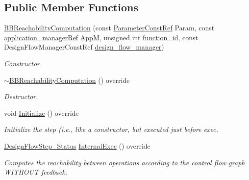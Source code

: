 \subsection*{Public Member Functions}
\begin{DoxyCompactItemize}
\item 
\hyperlink{classBBReachabilityComputation_a8bbcad478656b3c0c32e561f1e9b9536}{B\+B\+Reachability\+Computation} (const \hyperlink{Parameter_8hpp_a37841774a6fcb479b597fdf8955eb4ea}{Parameter\+Const\+Ref} Param, const \hyperlink{application__manager_8hpp_a04ccad4e5ee401e8934306672082c180}{application\+\_\+manager\+Ref} \hyperlink{classFrontendFlowStep_a0ac0d8db2a378416583f51c4faa59d15}{AppM}, unsigned int \hyperlink{classFunctionFrontendFlowStep_a58ef2383ad1a212a8d3f396625a4b616}{function\+\_\+id}, const Design\+Flow\+Manager\+Const\+Ref \hyperlink{classDesignFlowStep_ab770677ddf087613add30024e16a5554}{design\+\_\+flow\+\_\+manager})
\begin{DoxyCompactList}\small\item\em Constructor. \end{DoxyCompactList}\item 
\hyperlink{classBBReachabilityComputation_a160c7619898ba1b10f9b27e9c7e81e87}{$\sim$\+B\+B\+Reachability\+Computation} () override
\begin{DoxyCompactList}\small\item\em Destructor. \end{DoxyCompactList}\item 
void \hyperlink{classBBReachabilityComputation_ad2e0ecc294538d9a60d9175d345fc11c}{Initialize} () override
\begin{DoxyCompactList}\small\item\em Initialize the step (i.\+e., like a constructor, but executed just before exec. \end{DoxyCompactList}\item 
\hyperlink{design__flow__step_8hpp_afb1f0d73069c26076b8d31dbc8ebecdf}{Design\+Flow\+Step\+\_\+\+Status} \hyperlink{classBBReachabilityComputation_a9bfbe12285b834d001c922e29385a8c6}{Internal\+Exec} () override
\begin{DoxyCompactList}\small\item\em Computes the reachability between operations according to the control flow graph W\+I\+T\+H\+O\+UT feedback. \end{DoxyCompactList}\end{DoxyCompactItemize}
